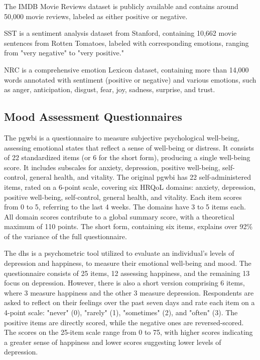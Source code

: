 \documentclass[a4paper,fleqn]{cas-dc}
\begin{document}
The IMDB Movie Reviews dataset \cite{IMDB} is publicly available and contains around 50,000 movie reviews, labeled as either positive or negative.

SST \cite{SST} is a sentiment analysis dataset from Stanford, containing 10,662 movie sentences from Rotten Tomatoes, labeled with corresponding emotions, ranging from "very negative" to "very positive."

NRC \cite{SaifmohammadLexicons} is a comprehensive emotion Lexicon dataset, containing more than 14,000 words annotated with sentiment (positive or negative) and various emotions, such as anger, anticipation, disgust, fear, joy, sadness, surprise, and trust.

\subsection{Mood Assessment Questionnaires}


The \gls{pgwbi} \cite{grossi_psychological_2014} is a questionnaire to measure subjective psychological well-being, assessing emotional states that reflect a sense of well-being or distress. It consists of 22 standardized items (or 6 for the short form), producing a single well-being score. It includes subscales for anxiety, depression, positive well-being, self-control, general health, and vitality. The original \gls{pgwbi} has 22 self-administered items, rated on a 6-point scale, covering six HRQoL domains: anxiety, depression, positive well-being, self-control, general health, and vitality. Each item scores from 0 to 5, referring to the last 4 weeks. The domains have 3 to 5 items each. All domain scores contribute to a global summary score, with a theoretical maximum of 110 points. The short form, containing six items, explains over 92\% of the variance of the full questionnaire.

The \gls{dhs} \cite{mcgreal_depression_happiness_1993, joseph_rapid_SDHS} is a psychometric tool utilized to evaluate an individual's levels of depression and happiness, to measure their emotional well-being and mood. The questionnaire consists of 25 items, 12 assessing happiness, and the remaining 13 focus on depression. However, there is also a short version comprising 6 items, where 3 measure happiness and the other 3 measure depression. Respondents are asked to reflect on their feelings over the past seven days and rate each item on a 4-point scale: "never" (0), "rarely" (1), "sometimes" (2), and "often" (3). The positive items are directly scored, while the negative ones are reversed-scored. The scores on the 25-item scale range from 0 to 75, with higher scores indicating a greater sense of happiness and lower scores suggesting lower levels of depression. 
\end{document}
